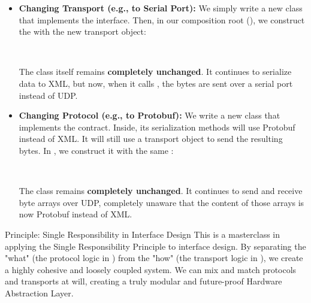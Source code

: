 \begin{itemize}
    \item \textbf{Changing Transport (e.g., to Serial Port):} We simply write a new  class that implements the  interface. Then, in our composition root (), we construct the  with the new transport object: 
    
     \\
    
    The  class itself remains \textbf{completely unchanged}. It continues to serialize data to XML, but now, when it calls , the bytes are sent over a serial port instead of UDP.

    \item \textbf{Changing Protocol (e.g., to Protobuf):} We write a new  class that implements the  contract. Inside, its serialization methods will use Protobuf instead of XML. It will still use a transport object to send the resulting bytes. In , we construct it with the same :
    
     \\
    
    The  class remains \textbf{completely unchanged}. It continues to send and receive byte arrays over UDP, completely unaware that the content of those arrays is now Protobuf instead of XML.
\end{itemize}

\begin{principlebox}{Principle: Single Responsibility in Interface Design}
This is a masterclass in applying the Single Responsibility Principle to interface design. By separating the "what" (the protocol logic in ) from the "how" (the transport logic in ), we create a highly cohesive and loosely coupled system. We can mix and match protocols and transports at will, creating a truly modular and future-proof Hardware Abstraction Layer.
\end{principlebox}


